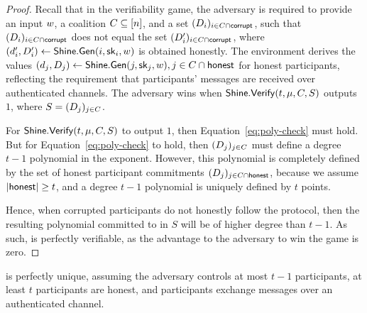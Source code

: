 \begin{proof}
  Recall that in the verifiability game,
  the adversary is required to provide an input $w$,
  a coalition $C \subseteq [n]$,
  and a set $ (D_i)_{i \in C \cap \mathsf{corrupt}}$,
  such that $ (D_i)_{i \in C \cap \mathsf{corrupt}}$ does not equal the set $(D_i')_{i \in C \cap \mathsf{corrupt}}$,
  where $(d_i', D_i') \gets \mathsf{Shine}.\mathsf{Gen}(i, \mathsf{sk}_i, w)$ is obtained honestly.
  The environment derives the values
  $(d_j, D_j) \gets \mathsf{Shine}.\mathsf{Gen}(j, \mathsf{sk}_j, w), j \in C \cap \mathsf{honest}$
  for honest participants, reflecting the requirement that participants' messages are received over authenticated channels.
%
  The adversary wins when
  $\mathsf{Shine}.\mathsf{Verify}(t, \mu, C, S)$ outputs $1$, where
  $S = (D_j)_{j \in C}$.

  For $\mathsf{Shine}.\mathsf{Verify}(t, \mu, C, S)$ to output $1$,
  then Equation~\ref{eq:poly-check} must hold.
  But for Equation~\ref{eq:poly-check} to hold,
  then $(D_j)_{j \in C}$ must define a degree $t-1$ polynomial in the exponent.
  However, this polynomial is completely defined by the set of honest participant commitments  $(D_j)_{j \in C \cap \mathsf{honest}}$,
  because we assume $\lvert \mathsf{honest} \rvert \geq t$,
  and a degree $t-1$ polynomial is uniquely defined by $t$ points.

  Hence, when corrupted participants do not honestly follow the protocol,
  then the resulting polynomial committed to in $S$ will be of higher degree than $t-1$.
  As such, \DVRFOne is perfectly verifiable,
  as the advantage to the adversary to win the game is zero.
\end{proof}

\begin{theorem} \label{thm:dcvrf-unique}
\DVRFOne is perfectly unique,
assuming the adversary controls at most $t-1$ participants,
at least $t$ participants are honest, and
participants exchange messages over an authenticated channel.
\end{theorem}


